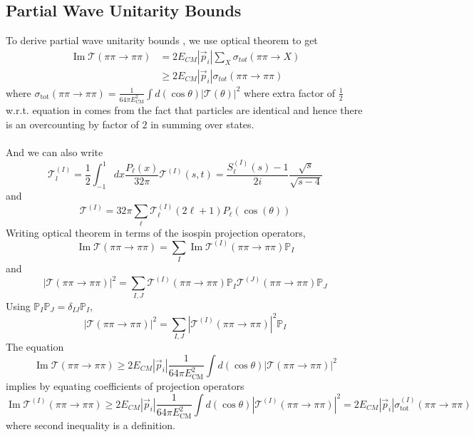 ﻿\documentclass[12pt,a4paper]{article}
\begin{document}
\subsection{Partial Wave Unitarity Bounds}
To derive partial wave unitarity bounds \cite{4}, we use optical theorem to get
$$
\begin{aligned}
\operatorname{Im} \mathcal{T}(\pi \pi \rightarrow \pi \pi) &=2 E_{C M}\left|\vec{p}_{i}\right| \sum_{X} \sigma_{t o t}(\pi \pi \rightarrow X) \\
& \geq 2 E_{C M}\left|\vec{p}_{i}\right| \sigma_{t o t}(\pi \pi \rightarrow \pi \pi)
\end{aligned}
$$
where $\sigma_{\mathrm{tot}}(\pi \pi \rightarrow \pi \pi)=\frac{1}{64 \pi E_{\mathrm{CM}}^{2}} \int d( \cos \theta)|\mathcal{\mathcal{T}}(\theta)|^{2}$ where extra factor of $\frac{1}{2}$ w.r.t. equation in \cite{4} comes from the fact that particles are identical and hence there is an overcounting by factor of $2$ in summing over states.\\\\ And we can also write 
$$
 \mathcal{T}_{l}^{(I)}= \frac{1}{2} \int_{-1}^{1} d x \frac{P_{\ell}(x)}{32 \pi} \mathcal{T}^{(I)}(s, t)=\frac{S_{\ell}^{(I)}(s)-1}{2i} \frac{\sqrt{s}}{\sqrt{s-4}}
$$
and 
$$\mathcal{T}^{(I)}=32 \pi \sum_{\ell} \mathcal{T}^{(I)}_{\ell}(2 \ell+1) P_{\ell}(\cos (\theta))$$
Writing optical theorem in terms of the isospin projection operators, 
$$\operatorname{Im} \mathcal{T}(\pi \pi \rightarrow \pi \pi)=\sum_{I} \operatorname{Im} \mathcal{T}^{(I)}(\pi \pi \rightarrow \pi \pi) \mathbb{P}_{I}$$
and
$$|\mathcal{T}(\pi \pi \rightarrow \pi \pi)|^{2}=\sum_{I,J}  \mathcal{T}^{(I)}(\pi \pi \rightarrow \pi \pi) \mathbb{P}_{I} \mathcal{T}^{(J)}(\pi \pi \rightarrow \pi \pi) \mathbb{P}_{J} $$
Using $\mathbb{P}_{I} \mathbb{P}_{J}=\delta_{I J} \mathbb{P}_{I}$,
$$|\mathcal{T}(\pi \pi \rightarrow \pi \pi)|^{2}=\sum_{I,J} | \mathcal{T}^{(I)}(\pi \pi \rightarrow \pi \pi)|^{2} \mathbb{P}_{I}  $$
The equation
$$ \operatorname{Im} \mathcal{T}(\pi \pi \rightarrow \pi \pi)  \geq 2 E_{C M}\left|\vec{p}_{i}\right| \frac{1}{64 \pi E_{\mathrm{CM}}^{2}} \int d(\cos \theta)|\mathcal{T}(\pi \pi \rightarrow \pi \pi)|^{2}$$
implies by equating coefficients of projection operators
$$ \operatorname{Im} \mathcal{T}^{(I)}(\pi \pi \rightarrow \pi \pi)  \geq 2 E_{C M}\left|\vec{p}_{i}\right| \frac{1}{64 \pi E_{\mathrm{CM}}^{2}} \int d(\cos \theta)|\mathcal{T}^{(I)}(\pi \pi \rightarrow \pi \pi)|^{2}=2 E_{C M}\left|\vec{p}_{i}\right|\sigma_{\text {tot }}^{(I)}(\pi \pi \rightarrow \pi \pi) $$
where second inequality is a definition.
\end{document}
